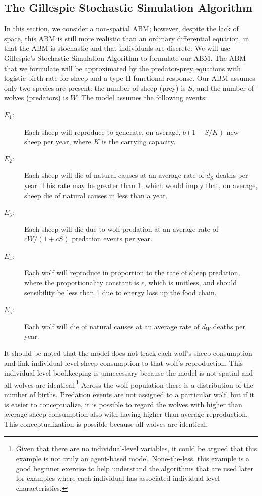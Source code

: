 \documentclass[11pt, oneside]{article}   	%
\begin{document}
\subsection{The Gillespie Stochastic Simulation Algorithm}
In this section, we consider a non-spatial ABM; however, despite the lack of space, this ABM is still more realistic than an ordinary differential equation, in that the ABM is stochastic and that individuals are discrete. We will use Gillespie's Stochastic Simulation Algorithm \citep{Gillespie} to formulate our ABM. The ABM that we formulate will be approximated by the predator-prey equations with logistic birth rate for sheep and a type II functional response. Our ABM assumes only two species are present: the number of sheep (prey) is $S$, and the number of wolves (predators) is $W$. The model assumes the following events:

\begin{description} 
\item[$E_1:$] Each sheep will reproduce to generate, on average, $b(1-S/K)$ new sheep per year, where $K$ is the carrying capacity.
\item[$E_2:$] Each sheep will die of natural causes at an average rate of $d_S$ deaths per year. This rate may be greater than 1, which would imply that, on average, sheep die of natural causes in less than a year.
\item[$E_3:$] Each sheep will die due to wolf predation at an average rate of $cW/(1+cS)$ predation events per year.
\item[$E_4:$] Each wolf will reproduce in proportion to the rate of sheep predation, where the proportionality constant is $\epsilon$, which is unitless, and should sensibility be less than 1 due to energy loss up the food chain. 
\item[$E_5:$] Each wolf will die of natural causes at an average rate of $d_W$ deaths per year.
\end{description}
 
It should be noted that the model does not track each wolf's sheep consumption and link individual-level sheep consumption to that wolf's reproduction. This individual-level bookkeeping is unnecessary because the model is not spatial and all wolves are identical.\footnote{Given that there are no individual-level variables, it could be argued that this example is not truly an agent-based model. None-the-less, this example is a good beginner exercise to help understand the algorithms that are used later for examples where each individual has associated individual-level characteristics.} Across the wolf population there is a distribution of the number of births. Predation events are not assigned to a particular wolf, but if it is easier to conceptualize, it is possible to regard the wolves with higher than average sheep consumption also with having higher than average reproduction. This conceptualization is possible because all wolves are identical.
\end{document}
